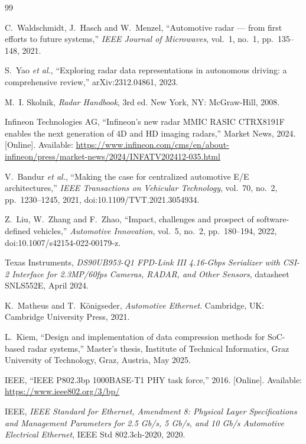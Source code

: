 \begin{thebibliography}{99}

C.~Waldschmidt, J.~Hasch and W.~Menzel, ``Automotive radar --- from first
efforts to future systems,'' \emph{IEEE Journal of Microwaves}, vol.~1, no.~1,
pp.~135--148, 2021.

S.~Yao \emph{et al.}, ``Exploring radar data representations in autonomous
driving: a comprehensive review,'' arXiv:2312.04861, 2023.

M.~I. Skolnik, \emph{Radar Handbook}, 3rd ed. New York, NY: McGraw-Hill, 2008.

Infineon Technologies AG, ``Infineon's new radar MMIC RASIC CTRX8191F
enables the next generation of 4D and HD imaging radars,'' Market News, 2024.
[Online]. Available:
\url{https://www.infineon.com/cms/en/about-infineon/press/market-news/2024/INFATV202412-035.html}

V.~Bandur \emph{et al.}, ``Making the case for centralized automotive E/E
architectures,'' \emph{IEEE Transactions on Vehicular Technology}, vol.~70,
no.~2, pp.~1230--1245, 2021, doi:10.1109/TVT.2021.3054934.

Z.~Liu, W.~Zhang and F.~Zhao, ``Impact, challenges and prospect of
software-defined vehicles,'' \emph{Automotive Innovation}, vol.~5, no.~2,
pp.~180--194, 2022, doi:10.1007/s42154-022-00179-z.

Texas Instruments, \emph{DS90UB953-Q1 FPD-Link III 4.16-Gbps Serializer with
CSI-2 Interface for 2.3MP/60fps Cameras, RADAR, and Other Sensors}, datasheet
SNLS552E, April 2024.

K.~Matheus and T.~K\"onigseder, \emph{Automotive Ethernet}. Cambridge, UK:
Cambridge University Press, 2021.

L.~Kiem, ``Design and implementation of data compression methods for SoC-based
radar systems,'' Master's thesis, Institute of Technical Informatics, Graz
University of Technology, Graz, Austria, May 2025.

IEEE, ``IEEE P802.3bp 1000BASE-T1 PHY task force,'' 2016. [Online].
Available: \url{https://www.ieee802.org/3/bp/}

IEEE, \emph{IEEE Standard for Ethernet, Amendment 8: Physical Layer
Specifications and Management Parameters for 2.5 Gb/s, 5 Gb/s, and 10 Gb/s
Automotive Electrical Ethernet}, IEEE Std 802.3ch-2020, 2020.


\end{thebibliography}
